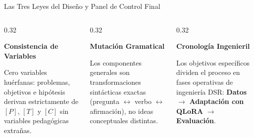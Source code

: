 \documentclass[aspectratio=169, 10pt, spanish]{beamer}
\begin{document}
\begin{frame}{Las Tres Leyes del Diseño y Panel de Control Final}
    \vspace{-0.3cm}
    \begin{columns}[T]
        \begin{column}{0.32\textwidth}
            \begin{tcolorbox}[enhanced, colback=bpLightGray, colframe=bpNavy, title=\textbf{\scriptsize 1. El Título es la Ley}, arc=1.5mm, left=1.5mm, right=1.5mm, top=1.5mm, bottom=1.5mm]
                \tiny
                \centering
                \textbf{\color{bpNavy}Consistencia de Variables}\\[0.1cm]
                \raggedright
                Cero variables huérfanas: problemas, objetivos e hipótesis derivan estrictamente de $[P]$, $[T]$ y $[C]$ sin variables pedagógicas extrañas.
            \end{tcolorbox}
        \end{column}
        
        \begin{column}{0.32\textwidth}
            \begin{tcolorbox}[enhanced, colback=bpLightGray, colframe=bpNavy, title=\textbf{\scriptsize 2. Transformación}, arc=1.5mm, left=1.5mm, right=1.5mm, top=1.5mm, bottom=1.5mm]
                \tiny
                \centering
                \textbf{\color{bpNavy}Mutación Gramatical}\\[0.1cm]
                \raggedright
                Los componentes generales son transformaciones sintácticas exactas (pregunta $\leftrightarrow$ verbo $\leftrightarrow$ afirmación), no ideas conceptuales distintas.
            \end{tcolorbox}
        \end{column}

        \begin{column}{0.32\textwidth}
            \begin{tcolorbox}[enhanced, colback=bpLightGray, colframe=bpNavy, title=\textbf{\scriptsize 3. Secuencia Lógica}, arc=1.5mm, left=1.5mm, right=1.5mm, top=1.5mm, bottom=1.5mm]
                \tiny
                \centering
                \textbf{\color{bpNavy}Cronología Ingenieril}\\[0.1cm]
                \raggedright
                Los objetivos específicos dividen el proceso en fases operativas de ingeniería DSR: \textbf{Datos} $\rightarrow$ \textbf{Adaptación con QLoRA} $\rightarrow$ \textbf{Evaluación}.
            \end{tcolorbox}
        \end{column}
    \end{columns}


\end{frame}
\end{document}
